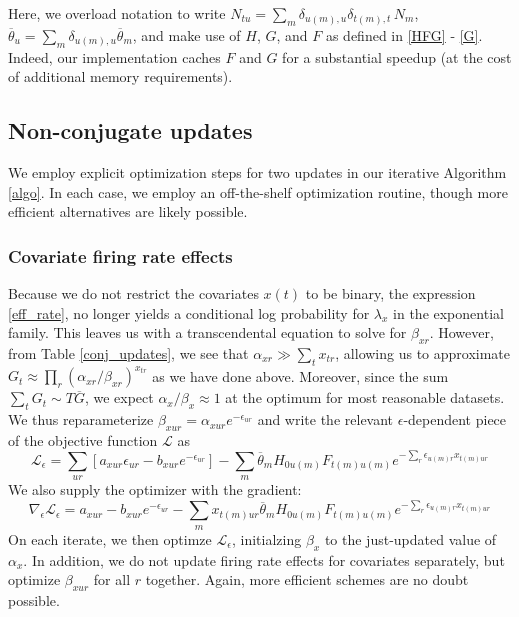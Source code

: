 \documentclass{article} %
\begin{document}
Here, we overload notation to write $N_{tu} = \sum_m \delta_{u(m), u} \delta_{t(m), t}\, N_m$, $\overline{\theta}_u = \sum_m \delta_{u(m), u}\overline{\theta}_m$, and make use of $H$, $G$, and $F$ as defined in \ref{HFG} - \ref{G}. Indeed, our implementation caches $F$ and $G$ for a substantial speedup (at the cost of additional memory requirements).

\subsection{Non-conjugate updates}
\label{non-conj} 
We employ explicit optimization steps for two updates in our iterative Algorithm \ref{algo}. In each case, we employ an off-the-shelf optimization routine, though more efficient alternatives are likely possible.

\subsubsection{Covariate firing rate effects}
\label{beta_x}
Because we do not restrict the covariates $x(t)$ to be binary, the expression \ref{eff_rate}, no longer yields a conditional log probability for $\lambda_x$ in the exponential family. This leaves us with a transcendental equation to solve for $\beta_{xr}$. However, from Table \ref{conj_updates}, we see that $\alpha_{xr} \gg \sum_t x_{tr}$, allowing us to approximate $G_t \approx \prod_r (\alpha_{xr}/\beta_{xr})^{x_{tr}}$ as we have done above. Moreover, since the sum $\sum_t G_t \sim T\overline{G}$, we expect $\alpha_x / \beta_x \approx 1$ at the optimum for most reasonable datasets. We thus reparameterize $\beta_{xur} = \alpha_{xur}e^{-\epsilon_{ur}}$ and write the relevant $\epsilon$-dependent piece of the objective function $\mathcal{L}$ as
\begin{equation}
    \mathcal{L}_\epsilon = \sum_{ur} \left[a_{xur}\epsilon_{ur} - b_{xur}e^{-\epsilon_{ur}} \right] - \sum_m \overline{\theta}_m H_{0u(m)} F_{t(m)u(m)} 
    e^{-\sum_r \epsilon_{u(m)r} x_{t(m)ur}}
\end{equation}
We also supply the optimizer with the gradient:
\begin{equation}
    \nabla_\epsilon \mathcal{L}_\epsilon = a_{xur} - b_{xur}e^{-\epsilon_{ur}}  - \sum_m x_{t(m)ur} \overline{\theta}_m H_{0u(m)} F_{t(m)u(m)} 
    e^{-\sum_r \epsilon_{u(m)r} x_{t(m)ur}}
\end{equation}
On each iterate, we then optimze $\mathcal{L}_\epsilon$, initialzing $\beta_x$ to the just-updated value of $\alpha_x$. In addition, we do not update firing rate effects for covariates separately, but optimize $\beta_{xur}$ for all $r$ together. Again, more efficient schemes are no doubt possible.
\end{document}
